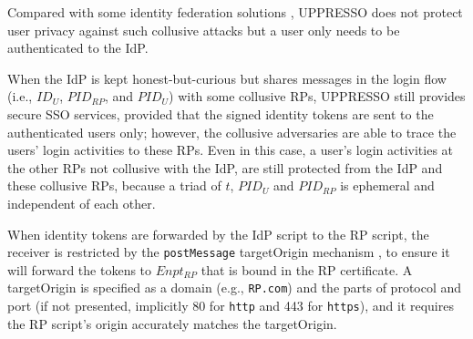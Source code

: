 


\vspace{0.8mm}
Compared with some identity federation solutions \cite{ELPASSO,UnlimitID,hyperledge-idemix,PseudoID,Opaak,uprov},
UPPRESSO does not protect user privacy against such collusive attacks
    but a user only needs to be authenticated to the IdP.

When the IdP is kept honest-but-curious but shares messages in the login flow (i.e.,
$ID_U$, $PID_{RP}$, and $PID_U$)
        with some collusive RPs,
UPPRESSO still provides secure SSO services,
    provided that the signed identity tokens are sent to the authenticated users only;
however,
    the collusive adversaries are able to trace the users' login activities to these RPs.
Even in this case, a user's login activities at the other RPs not collusive with the IdP,
        are still protected from the IdP and these collusive RPs,
        because a triad of $t$, $PID_U$ and $PID_{RP}$ is ephemeral and independent of each other.
%


\vspace{0.8mm}
When identity tokens are forwarded by the IdP script to the RP script, %
    the receiver is restricted by the \verb+postMessage+ targetOrigin mechanism \cite{postm-targeto},
        to ensure it will forward the tokens to $Enpt_{RP}$
        that is bound in the RP certificate.
A targetOrigin is specified as
    a domain (e.g., \verb+RP.com+) and the parts of protocol and port (if not presented, implicitly 80 for \verb+http+ and 443 for \verb+https+),
        and it requires the RP script's origin accurately matches the targetOrigin.

